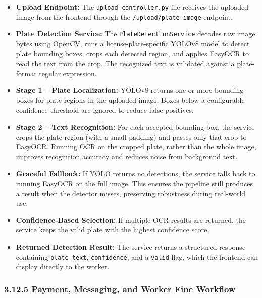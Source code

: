 \documentclass[12pt,a4paper,oneside]{report}
\begin{document}
\begin{itemize}[leftmargin=2em]
    \item \textbf{Upload Endpoint:} The \texttt{upload\_controller.py} file receives the uploaded image from the frontend through the \texttt{/upload/plate-image} endpoint.

    \item \textbf{Plate Detection Service:} The \texttt{PlateDetectionService} decodes raw image bytes using OpenCV, runs a license-plate-specific YOLOv8 model to detect plate bounding boxes, crops each detected region, and applies EasyOCR to read the text from the crop. The recognized text is validated against a plate-format regular expression.

    \item \textbf{Stage 1 -- Plate Localization:} YOLOv8 returns one or more bounding boxes for plate regions in the uploaded image. Boxes below a configurable confidence threshold are ignored to reduce false positives.

    \item \textbf{Stage 2 -- Text Recognition:} For each accepted bounding box, the service crops the plate region (with a small padding) and passes only that crop to EasyOCR. Running OCR on the cropped plate, rather than the whole image, improves recognition accuracy and reduces noise from background text.

    \item \textbf{Graceful Fallback:} If YOLO returns no detections, the service falls back to running EasyOCR on the full image. This ensures the pipeline still produces a result when the detector misses, preserving robustness during real-world use.

    \item \textbf{Confidence-Based Selection:} If multiple OCR results are returned, the service keeps the valid plate with the highest confidence score.

    \item \textbf{Returned Detection Result:} The service returns a structured response containing \texttt{plate\_text}, \texttt{confidence}, and a \texttt{valid} flag, which the frontend can display directly to the worker.
\end{itemize}

\subsubsection*{3.12.5 Payment, Messaging, and Worker Fine Workflow}
\end{document}
